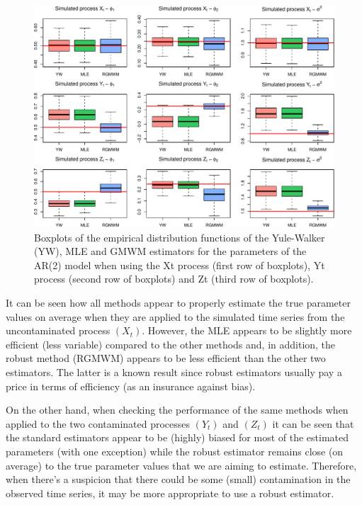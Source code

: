 \documentclass[]{book}
\theoremstyle{definition}
\theoremstyle{definition}
\theoremstyle{definition}
\theoremstyle{remark}
\begin{document}
\begin{figure}

{\centering \includegraphics{ts_files/figure-latex/unnamed-chunk-30-1} 

}

\caption{Boxplots of the empirical distribution functions of the Yule-Walker (YW), MLE and GMWM estimators for the parameters of the AR(2) model when using the Xt process (first row of boxplots), Yt process (second row of boxplots) and Zt (third row of boxplots).}\label{fig:unnamed-chunk-30}
\end{figure}

It can be seen how all methods appear to properly estimate the true
parameter values on average when they are applied to the simulated time
series from the uncontaminated process \((X_t)\). However, the MLE
appears to be slightly more efficient (less variable) compared to the
other methods and, in addition, the robust method (RGMWM) appears to be
less efficient than the other two estimators. The latter is a known
result since robust estimators usually pay a price in terms of
efficiency (as an insurance against bias).

On the other hand, when checking the performance of the same methods
when applied to the two contaminated processes \((Y_t)\) and \((Z_t)\)
it can be seen that the standard estimators appear to be (highly) biased
for most of the estimated parameters (with one exception) while the
robust estimator remains close (on average) to the true parameter values
that we are aiming to estimate. Therefore, when there's a suspicion that
there could be some (small) contamination in the observed time series,
it may be more appropriate to use a robust estimator.
\end{document}
